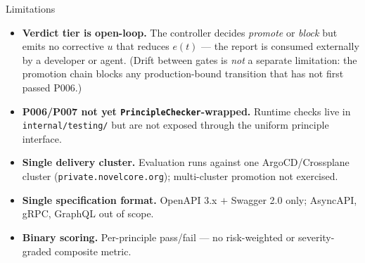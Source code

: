 \documentclass[11pt,aspectratio=169]{beamer}
\begin{document}
\begin{frame}{Limitations}

\footnotesize

\begin{itemize}\setlength\itemsep{0.25em}
\item \textbf{Verdict tier is open-loop.} The controller decides
  \emph{promote} or \emph{block} but emits no corrective $u$ that
  reduces $e(t)$ --- the report is consumed externally by a developer
  or agent. (Drift between gates is \emph{not} a separate limitation:
  the promotion chain blocks any production-bound transition that has
  not first passed P006.)

\item \textbf{P006/P007 not yet \texttt{PrincipleChecker}-wrapped.}
  Runtime checks live in \texttt{internal/testing/} but are not exposed
  through the uniform principle interface.

\item \textbf{Single delivery cluster.} Evaluation runs against one
  ArgoCD/Crossplane cluster (\texttt{private.novelcore.org}); multi-cluster
  promotion not exercised.

\item \textbf{Single specification format.} OpenAPI 3.x $+$ Swagger 2.0 only;
  AsyncAPI, gRPC, GraphQL out of scope.

\item \textbf{Binary scoring.} Per-principle pass/fail --- no
  risk-weighted or severity-graded composite metric.
\end{itemize}

\end{frame}
\end{document}
